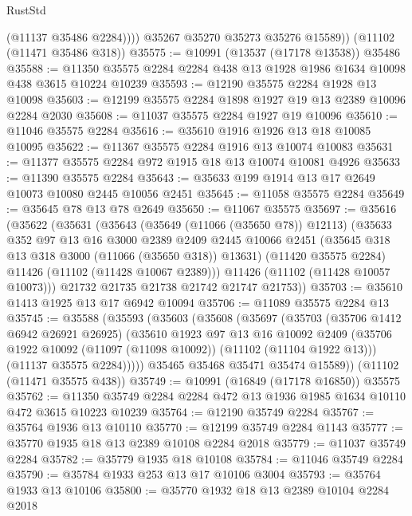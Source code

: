 \begin{lexlean}{RustStd}
\begin{coremodule}
              (@11137 @35486 @2284))))
        @35267
        @35270
        @35273
        @35276
        @15589))
    (@11102 (@11471 @35486 @318))
@35575 := @10991 (@13537 (@17178 @13538)) @35486
@35588 := @11350 @35575 @2284 @2284 @438 @13 @1928 @1986 @1634 @10098 @438 @3615 @10224 @10239
@35593 := @12190 @35575 @2284 @1928 @13 @10098
@35603 := @12199 @35575 @2284 @1898 @1927 @19 @13 @2389 @10096 @2284 @2030
@35608 := @11037 @35575 @2284 @1927 @19 @10096
@35610 := @11046 @35575 @2284
@35616 := @35610 @1916 @1926 @13 @18 @10085 @10095
@35622 := @11367 @35575 @2284 @1916 @13 @10074 @10083
@35631 := @11377 @35575 @2284 @972 @1915 @18 @13 @10074 @10081 @4926
@35633 := @11390 @35575 @2284
@35643 := @35633 @199 @1914 @13 @17 @2649 @10073 @10080 @2445 @10056 @2451
@35645 := @11058 @35575 @2284
@35649 := @35645 @78 @13 @78 @2649
@35650 := @11067 @35575
@35697 := @35616
    (@35622
      (@35631
        (@35643
          (@35649 (@11066 (@35650 @78)) @12113)
          (@35633
            @352
            @97
            @13
            @16
            @3000
            @2389
            @2409
            @2445
            @10066
            @2451
            (@35645 @318 @13 @318 @3000 (@11066 (@35650 @318)) @13631)
            (@11420 @35575 @2284)
            @11426
            (@11102 (@11428 @10067 @2389)))
          @11426
          (@11102 (@11428 @10057 @10073)))
        @21732
        @21735
        @21738
        @21742
        @21747
        @21753))
@35703 := @35610 @1413 @1925 @13 @17 @6942 @10094
@35706 := @11089 @35575 @2284 @13
@35745 := @35588
    (@35593
      (@35603
        (@35608
          (@35697
            (@35703
              (@35706 @1412 @6942 @26921 @26925)
              (@35610
                @1923
                @97
                @13
                @16
                @10092
                @2409
                (@35706 @1922 @10092 (@11097 (@11098 @10092)) (@11102 (@11104 @1922 @13)))
                (@11137 @35575 @2284)))))
        @35465
        @35468
        @35471
        @35474
        @15589))
    (@11102 (@11471 @35575 @438))
@35749 := @10991 (@16849 (@17178 @16850)) @35575
@35762 := @11350 @35749 @2284 @2284 @472 @13 @1936 @1985 @1634 @10110 @472 @3615 @10223 @10239
@35764 := @12190 @35749 @2284
@35767 := @35764 @1936 @13 @10110
@35770 := @12199 @35749 @2284 @1143
@35777 := @35770 @1935 @18 @13 @2389 @10108 @2284 @2018
@35779 := @11037 @35749 @2284
@35782 := @35779 @1935 @18 @10108
@35784 := @11046 @35749 @2284
@35790 := @35784 @1933 @253 @13 @17 @10106 @3004
@35793 := @35764 @1933 @13 @10106
@35800 := @35770 @1932 @18 @13 @2389 @10104 @2284 @2018

\end{coremodule}
\end{lexlean}
